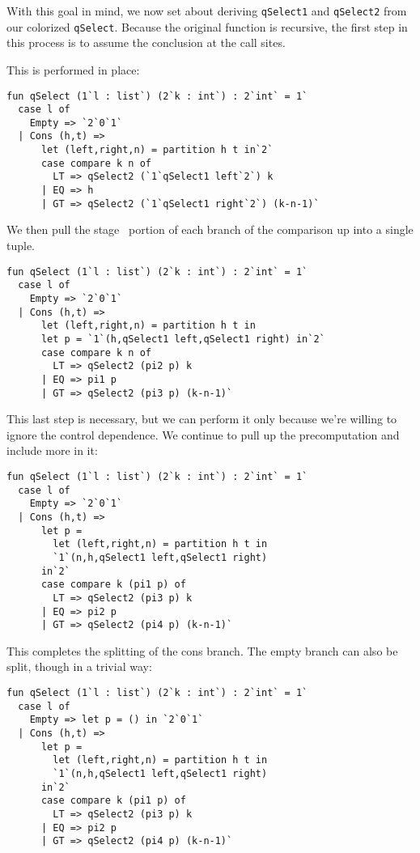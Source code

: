 
With this goal in mind, we now set about deriving \texttt{qSelect1} and \texttt{qSelect2} from our colorized \texttt{qSelect}.
Because the original function is recursive,
the first step in this process is to assume the conclusion at the call sites.


This is performed in place:
\begin{lstlisting} 
fun qSelect (1`l : list`) (2`k : int`) : 2`int` = 1`
  case l of
    Empty => `2`0`1`
  | Cons (h,t) => 
      let (left,right,n) = partition h t in`2`
      case compare k n of
        LT => qSelect2 (`1`qSelect1 left`2`) k
      | EQ => h
      | GT => qSelect2 (`1`qSelect1 right`2`) (k-n-1)`
\end{lstlisting}
We then pull the stage \bbone\ portion of each branch of the
comparison up into a single tuple.

\begin{lstlisting} 
fun qSelect (1`l : list`) (2`k : int`) : 2`int` = 1`
  case l of
    Empty => `2`0`1`
  | Cons (h,t) => 
      let (left,right,n) = partition h t in
      let p = `1`(h,qSelect1 left,qSelect1 right) in`2`
      case compare k n of
        LT => qSelect2 (pi2 p) k
      | EQ => pi1 p
      | GT => qSelect2 (pi3 p) (k-n-1)`
\end{lstlisting}

This last step is necessary, but we can perform it only because we're willing to ignore the control dependence.
We continue to pull up the precomputation and include more in it:

\begin{lstlisting} 
fun qSelect (1`l : list`) (2`k : int`) : 2`int` = 1`
  case l of
    Empty => `2`0`1`
  | Cons (h,t) => 
      let p =
        let (left,right,n) = partition h t in
        `1`(n,h,qSelect1 left,qSelect1 right)
      in`2`
      case compare k (pi1 p) of
        LT => qSelect2 (pi3 p) k
      | EQ => pi2 p
      | GT => qSelect2 (pi4 p) (k-n-1)`
\end{lstlisting}

This completes the splitting of the cons branch.  
The empty branch can also be split, though in a trivial way:

\begin{lstlisting} 
fun qSelect (1`l : list`) (2`k : int`) : 2`int` = 1`
  case l of
    Empty => let p = () in `2`0`1`
  | Cons (h,t) => 
      let p =
        let (left,right,n) = partition h t in
        `1`(n,h,qSelect1 left,qSelect1 right)
      in`2`
      case compare k (pi1 p) of
        LT => qSelect2 (pi3 p) k
      | EQ => pi2 p
      | GT => qSelect2 (pi4 p) (k-n-1)`
\end{lstlisting}



